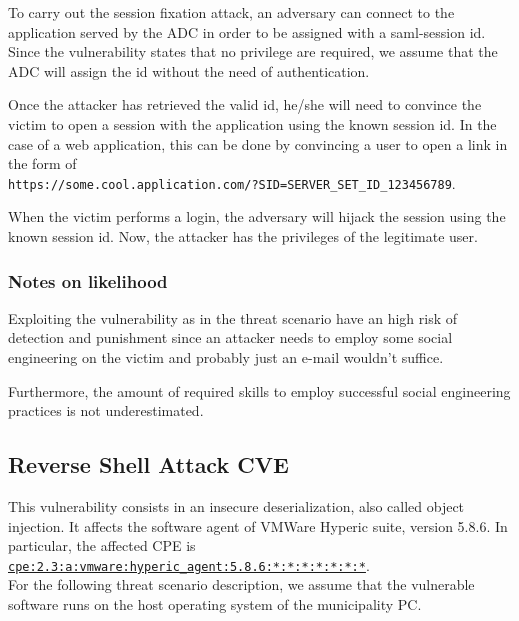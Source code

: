 To carry out the session fixation attack, an adversary can connect to the application served by the ADC in order to be assigned with a saml-session id. Since the vulnerability states that no privilege are required, we assume that the ADC will assign the id without the need of authentication.

Once the attacker has retrieved the valid id, he/she will need to convince the victim to open a session with the application using the known session id. In the case of a web application, this can be done by convincing a user to open a link in the form of \\ \texttt{https://some.cool.application.com/?SID=SERVER\_SET\_ID\_123456789}.

When the victim performs a login, the adversary will hijack the session using the known session id.\cite{article:kolsek2002session} Now, the attacker has the privileges of the legitimate user.

\subsubsection*{Notes on likelihood}

Exploiting the vulnerability as in the threat scenario have an high risk of detection and punishment since an attacker needs to employ some social engineering on the victim and probably just an e-mail wouldn't suffice.

Furthermore, the amount of required skills to employ successful social engineering practices is not underestimated.

\subsection*{Reverse Shell Attack \- CVE}

This vulnerability consists in an insecure deserialization, also called object injection. It affects the software agent of VMWare Hyperic suite, version 5.8.6. In particular, the affected CPE is \\ \href{https://nvd.nist.gov/products/cpe/detail/5976A94C-7191-4547-8205-494B8379A0A3?namingFormat=2.3&orderBy=CPEURI&keyword=cpe%3A2.3%3Aa%3Avmware%3Ahyperic_agent%3A5.8.6%3A*%3A*%3A*%3A*%3A*%3A*%3A*&status=FINAL%2CDEPRECATED}{\texttt{cpe:2.3:a:vmware:hyperic\_agent:5.8.6:*:*:*:*:*:*:*}}.\\

For the following threat scenario description, we assume that the vulnerable software runs on the host operating system of the municipality PC.

